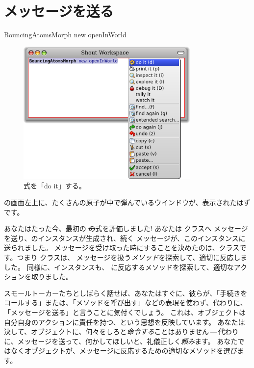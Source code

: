 \documentclass[a4paper,10pt,twoside]{book}
\begin{document}
\section{メッセージを送る}


\begin{code}{}
BouncingAtomsMorph new openInWorld
\end{code}


\begin{figure}[htb]
\centerline {\includegraphics[width=0.8\textwidth]{Doit}}
\caption{式を「do it」する。}
\end{figure}

\pharo の画面左上に、たくさんの原子が中で弾んでいるウインドウが、表示されたはずです。

あなたはたった今、最初の \st の式を評価しました!
あなたは \bam クラスへ  メッセージを送り、\bam のインスタンスが生成され、続く  メッセージが、このインスタンスに送られました。
 メッセージを受け取った時にすることを決めたのは、\bam クラスです。つまり \bam クラスは、 メッセージを扱う\emph{メソッド}を探索して、適切に反応しました。
同様に、\bam インスタンスも、 に反応するメソッドを探索して、適切なアクションを取りました。

スモールトーカーたちとしばらく話せば、あなたはすぐに、彼らが、「手続きをコールする」または、「メソッドを呼び出す」などの表現を使わず、代わりに、「メッセージを送る」と言うことに気付くでしょう。
これは、オブジェクトは自分自身のアクションに責任を持つ、という思想を反映しています。
あなたは決して、オブジェクトに、何々をしろと\emph{命令する}ことはありません\,---\,代わりに、メッセージを送って、何かしてほしいと、礼儀正しく\emph{頼み}ます。
あなたではなくオブジェクトが、メッセージに反応するための適切なメソッドを選びます。
\end{document}
